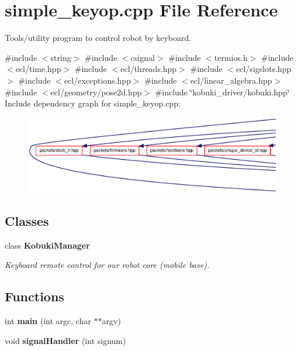 \section{simple\-\_\-keyop.\-cpp \-File \-Reference}
\label{simple__keyop_8cpp}


\-Tools/utility program to control robot by keyboard.  


{\ttfamily \#include $<$string$>$}\*
{\ttfamily \#include $<$csignal$>$}\*
{\ttfamily \#include $<$termios.\-h$>$}\*
{\ttfamily \#include $<$ecl/time.\-hpp$>$}\*
{\ttfamily \#include $<$ecl/threads.\-hpp$>$}\*
{\ttfamily \#include $<$ecl/sigslots.\-hpp$>$}\*
{\ttfamily \#include $<$ecl/exceptions.\-hpp$>$}\*
{\ttfamily \#include $<$ecl/linear\-\_\-algebra.\-hpp$>$}\*
{\ttfamily \#include $<$ecl/geometry/pose2d.\-hpp$>$}\*
{\ttfamily \#include \char`\"{}kobuki\-\_\-driver/kobuki.\-hpp\char`\"{}}\*
\-Include dependency graph for simple\-\_\-keyop.\-cpp\-:
\nopagebreak
\begin{figure}[H]
\begin{center}
\leavevmode
\includegraphics[width=350pt]{simple__keyop_8cpp__incl}
\end{center}
\end{figure}
\subsection*{\-Classes}
\begin{DoxyCompactItemize}
\item 
class {\bf \-Kobuki\-Manager}
\begin{DoxyCompactList}\small\item\em \-Keyboard remote control for our robot core (mobile base). \end{DoxyCompactList}\end{DoxyCompactItemize}
\subsection*{\-Functions}
\begin{DoxyCompactItemize}
\item 
int {\bf main} (int argc, char $\ast$$\ast$argv)
\item 
void {\bf signal\-Handler} (int signum)
\end{DoxyCompactItemize}
